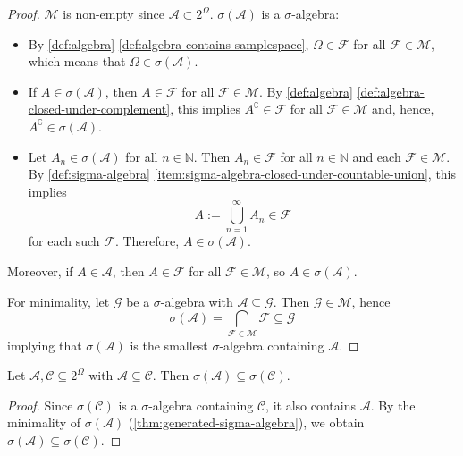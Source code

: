 \begin{proof}
$\mathcal{M}$ is non-empty since $\mathcal{A}\subset 2^\Omega$.
$\sigma(\mathcal{A})$ is a $\sigma$-algebra:
\begin{itemize}
\item
By \autoref{def:algebra} \ref{def:algebra-contains-samplespace}, $\Omega \in \mathcal{F}$ for all $\mathcal{F}\in \mathcal{M}$, which means that $\Omega \in \sigma(\mathcal{A})$.
\cmark
\item
If $A \in \sigma(\mathcal{A})$, then $A \in \mathcal{F}$ for all $\mathcal{F}\in \mathcal{M}$.
By \autoref{def:algebra} \ref{def:algebra-closed-under-complement}, this implies $A^\complement \in \mathcal{F}$ for all $\mathcal{F}\in \mathcal{M}$ and, hence, $A^\complement \in \sigma(\mathcal{A})$.
\cmark
\item
Let $A_n \in \sigma(\mathcal{A})$ for all $n \in \mathbb{N}$.
Then $A_n \in \mathcal{F}$ for all $n\in \mathbb{N}$ and each $\mathcal{F}\in \mathcal{M}$.
By \autoref{def:sigma-algebra} \ref{item:sigma-algebra-closed-under-countable-union}, this implies
\[
  A := \bigcup_{n=1}^{\infty} A_n \in \mathcal{F}
\]
for each such $\mathcal{F}$.
Therefore, $A \in \sigma(\mathcal{A})$.
\cmark
\end{itemize}
Moreover, if $A \in \mathcal{A}$, then $A \in \mathcal{F}$ for all $\mathcal{F}\in \mathcal{M}$, so $A \in \sigma(\mathcal{A})$.

For minimality, let $\mathcal{G}$ be a $\sigma$-algebra with $\mathcal{A} \subseteq \mathcal{G}$. Then $\mathcal{G} \in \mathcal{M}$, hence
\[
\sigma(\mathcal{A}) = \bigcap_{\mathcal{F} \in \mathcal{M}} \mathcal{F} \subseteq \mathcal{G}
\]
implying that $\sigma(\mathcal{A})$ is the smallest $\sigma$-algebra containing $\mathcal{A}$.
\end{proof}

\begin{lemma}[Monotonicity]\label{lem:sigma-monotone}
Let $\mathcal{A},\mathcal{C} \subseteq 2^\Omega$ with
\(
\mathcal{A} \subseteq \mathcal{C}
\).
Then
\(
\sigma(\mathcal{A}) \subseteq \sigma(\mathcal{C})
\).
\end{lemma}

\begin{proof}
Since $\sigma(\mathcal{C})$ is a $\sigma$-algebra containing $\mathcal{C}$, it also contains $\mathcal{A}$.
By the minimality of $\sigma(\mathcal{A})$ (\autoref{thm:generated-sigma-algebra}), we obtain
\(
\sigma(\mathcal{A}) \subseteq \sigma(\mathcal{C})
\).
\end{proof}

